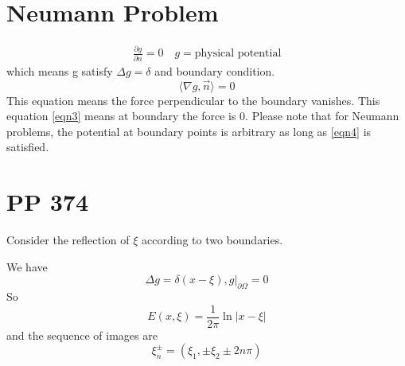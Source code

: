 \documentclass{article}
\newcommand{\Sangle}[1]{\langle {#1} \rangle}
\numberwithin{equation}{section}
\newcommand{\<}{\langle}
\begin{document}
\section{Neumann Problem}
\begin{align}
	\frac{\partial g}{\partial n} = 0 \quad g = \text{physical potential} \label{eqn4}
\end{align}
which means g satisfy $\Delta g = \delta$ and boundary condition.
\begin{equation}	
	\Sangle{\nabla g, \vec{n}} = 0 \label{eqn3}
\end{equation}
This equation means the force perpendicular to the boundary vanishes. This equation \eqref{eqn3} means at boundary the force is 0. Please note that for Neumann problems, the potential at boundary points is arbitrary as long as \eqref{eqn4} is satisfied.

\section{PP 374}
\setcounter{equation}{0}
\begin{center}
\end{center}
\begin{tcolorbox}
Consider the reflection of $\xi$ according to two boundaries.
\end{tcolorbox}
We have 
\begin{equation}
	\Delta g = \delta(x - \xi), g|_{\partial \Omega} = 0
\end{equation}
So 
\begin{equation}
	E(x,\xi) = \frac{1}{2 \pi} \ln |x- \xi|
\end{equation}
and the sequence of images are 
\begin{equation*}
	\xi_n^{\pm} = (\xi_1, \pm \xi_2 \pm 2 n \pi)
\end{equation*}
\end{document}
